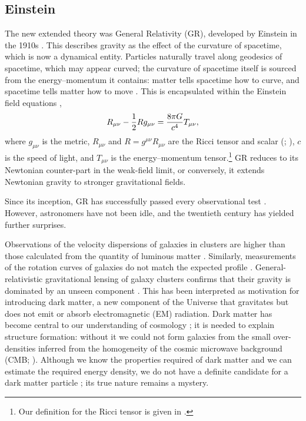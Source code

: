 \subsection{Einstein}

The new extended theory was General Relativity (GR), developed by Einstein in the 1910s \citep{Einstein1997}. This describes gravity as the effect of the curvature of spacetime, which is now a dynamical entity. Particles naturally travel along geodesics of spacetime, which may appear curved; the curvature of spacetime itself is sourced from the energy--momentum it contains: matter tells spacetime how to curve, and spacetime tells matter how to move \citep[section 1.1]{Misner1973}. This is encapsulated within the Einstein field equations \citep[documents 22, 25]{Einstein1997},
\begin{equation}
R_{\mu\nu} - \dfrac{1}{2}R g_{\mu\nu} = \dfrac{8\pi G}{c^4}T_{\mu\nu},
\end{equation}
where $g_{\mu\nu}$ is the metric, $R_{\mu\nu}$ and $R = g^{\mu\nu}R_{\mu\nu}$ are the Ricci tensor and scalar (\citealt[section 8.7]{Misner1973}; \citealt[section 3.2]{Wald1984}), $c$ is the speed of light, and $T_{\mu\nu}$ is the energy--momentum tensor.\footnote{Our definition for the Ricci tensor is given in .} GR reduces to its Newtonian counter-part in the weak-field limit, or conversely, it extends Newtonian gravity to stronger gravitational fields.

Since its inception, GR has successfully passed every observational test \citep{Will1993, Will2006}. However, astronomers have not been idle, and the twentieth century has yielded further surprises.

Observations of the velocity dispersions of galaxies in clusters are higher than those calculated from the quantity of luminous matter \citep[e.g.,][]{Zwicky1937}. Similarly, measurements of the rotation curves of galaxies do not match the expected profile \citep{Babcock1939}. General-relativistic gravitational lensing of galaxy clusters confirms that their gravity is dominated by an unseen component \citep{Bergmann1990,Clowe2006}. This has been interpreted as motivation for introducing dark matter, a new component of the Universe that gravitates but does not emit or absorb electromagnetic (EM) radiation. Dark matter has become central to our understanding of cosmology \citep[e.g.,][]{Springel2006a}; it is needed to explain structure formation: without it we could not form galaxies from the small over-densities inferred from the homogeneity of the cosmic microwave background (CMB; \citealt{White1978,Liddle1993}). Although we know the properties required of dark matter and we can estimate the required energy density, we do not have a definite candidate for a dark matter particle \citep{Bertone2005}; its true nature remains a mystery.

